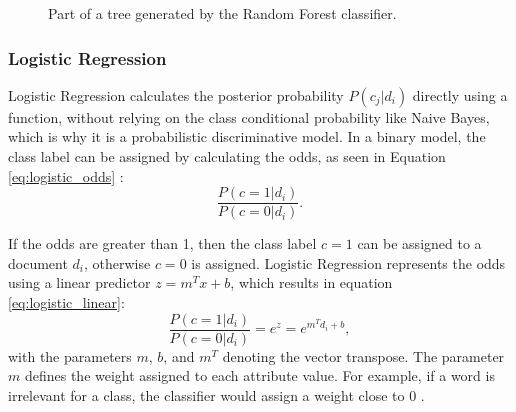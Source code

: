         \begin{figure}
        \centering
    \caption{Part of a tree generated by the Random Forest classifier.}
      \label{fig:tree}
\end{figure}
\subsubsection{Logistic Regression}
\label{sub:logistic}

Logistic Regression calculates the posterior probability $P(c_j|d_i)$ directly using a function, without relying on the class conditional probability like Naive Bayes, which is why it is a probabilistic discriminative model. In a binary model, the class label can be assigned by calculating the odds, as seen in Equation \eqref{eq:logistic_odds} \cite{DBLP:books/aw/TanSKK2019}:
        \begin{equation}
            \label{eq:logistic_odds}
                \frac{P(c=1|d_i)}{P(c=0|d_i)}.
        \end{equation}
        
If the odds are greater than 1, then the class label $c=1$ can be assigned to a document $d_i$, otherwise $c=0$ is assigned. Logistic Regression represents the odds using a linear predictor $z=m^Tx + b$, which results in equation \eqref{eq:logistic_linear}:
        \begin{equation}
            \label{eq:logistic_linear}
                \frac{P(c=1|d_i)}{P(c=0|d_i)} = e^z = e^{m^Td_i+b},
        \end{equation}
with the parameters $m$, $b$, and $m^T$ denoting the vector transpose. The parameter $m$ defines the weight assigned to each attribute value. For example, if a word is irrelevant for a class, the classifier would assign a weight close to 0 \cite{DBLP:books/aw/TanSKK2019}. 

